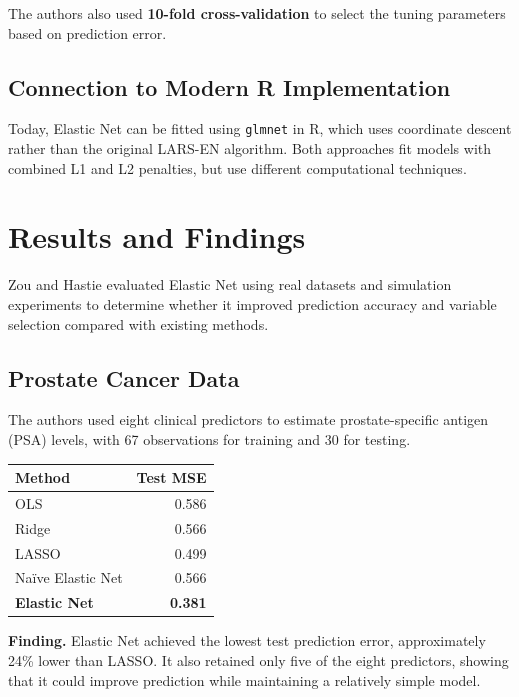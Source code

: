 \documentclass[
  letterpaper,
  DIV=11,
  numbers=noendperiod]{scrreprt}
\newcounter{none} %
\begin{document}
The authors also used \textbf{10-fold cross-validation} to select the
tuning parameters based on prediction error.

\subsection{Connection to Modern R
Implementation}\label{connection-to-modern-r-implementation}

Today, Elastic Net can be fitted using \texttt{glmnet} in R, which uses
coordinate descent rather than the original LARS-EN algorithm. Both
approaches fit models with combined L1 and L2 penalties, but use
different computational techniques.

\section{Results and Findings}\label{results-and-findings}

Zou and Hastie evaluated Elastic Net using real datasets and simulation
experiments to determine whether it improved prediction accuracy and
variable selection compared with existing methods.

\subsection{Prostate Cancer Data}\label{prostate-cancer-data}

The authors used eight clinical predictors to estimate prostate-specific
antigen (PSA) levels, with 67 observations for training and 30 for
testing.

{\def\LTcaptype{none} %
\begin{longtable}[]{@{}lr@{}}
\toprule\noalign{}
Method & Test MSE \\
\midrule\noalign{}
\endhead
\bottomrule\noalign{}
\endlastfoot
OLS & 0.586 \\
Ridge & 0.566 \\
LASSO & 0.499 \\
Naïve Elastic Net & 0.566 \\
\textbf{Elastic Net} & \textbf{0.381} \\
\end{longtable}
}

\textbf{Finding.} Elastic Net achieved the lowest test prediction error,
approximately 24\% lower than LASSO. It also retained only five of the
eight predictors, showing that it could improve prediction while
maintaining a relatively simple model.
\end{document}
